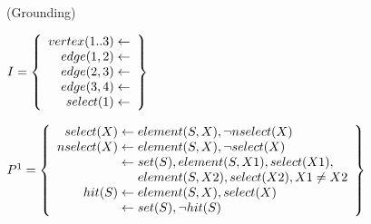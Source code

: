 \begin{Uebung}{(Grounding)}
\begin{UList}
\(
  I 
  = 
  \left\{
  \begin{array}{r@{}c}
    vertex(1..3) & {} \leftarrow \\
    edge(1,2) & {} \leftarrow \\
    edge(2,3) & {} \leftarrow \\
    edge(3,4) & {} \leftarrow \\
    select(1) & {} \leftarrow
  \end{array}
  \right\}
\)
%
\vspace{5mm}
\item
\(
  \Pi\text{\footnotemark}
  = 
  \left\{
  \begin{array}{r@{}c@{}l}
    select(X) & {} \leftarrow {} & element(S,X), \naf{nselect(X)} \\
    nselect(X) & {} \leftarrow {} & element(S,X), \naf{select(X)} \\
    & {} \leftarrow {} & set(S), element(S,X1), select(X1), \\
    & {}            {} & element(S,X2), select(X2), X1 \neq X2\\
    hit(S) & {} \leftarrow {} & element(S,X), select(X) \\
    & {} \leftarrow {} & set(S), \naf{hit(S)}
  \end{array}
  \right\}
\) %


\end{UList}
\end{Uebung}
